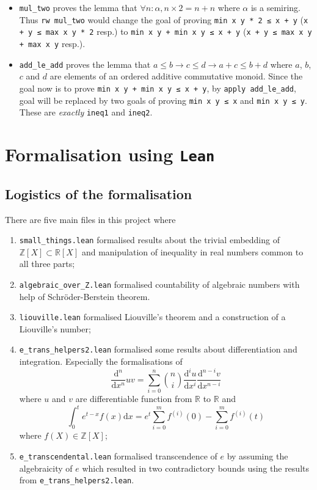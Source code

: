 \documentclass{report}
\theoremstyle{definition}
\begin{document}
\begin{itemize}
  \item {\tt \small mul\_two} proves the lemma that $\forall n:\alpha, n\times 2 = n+n$ where $\alpha$ is a semiring. Thus {\tt \small rw mul\_two} would change the goal of proving {\tt \small min x y * 2 ≤ x + y} ({\tt \small x + y ≤ max x y * 2} resp.) to {\tt \small min x y + min x y ≤ x + y} ({\tt \small x + y ≤ max x y + max x y} resp.).
  \item {\tt \small add\_le\_add} proves the lemma that $a \le b \to c \le d \to a + c \le b + d$ where $a$, $b$, $c$ and $d$ are elements of an ordered additive commutative monoid. Since the goal now is to prove {\tt \small min x y + min x y ≤ x + y}, by {\tt \small apply add\_le\_add}, goal will be replaced by two goals of proving {\tt \small min x y ≤ x} and {\tt \small min x y ≤ y}. These are {\it exactly} {\tt \small ineq1} and {\tt \small ineq2}.
\end{itemize}

\chapter{Formalisation using {\tt Lean}}\label{fmlsn}

\section*{Logistics of the formalisation}
There are five main files in this project where 
\begin{enumerate}
\item {\tt \small small\_things.lean} formalised results about the trivial embedding of $\mathbb Z[X]\subset \mathbb R[X]$ and manipulation of inequality in real numbers common to all three parts;
\item {\tt \small algebraic\_over\_Z.lean} formalised countability of algebraic numbers with help of Schröder-Berstein theorem.
\item {\tt \small liouville.lean} formalised Liouville's theorem and a construction of a Liouville's number;
\item {\tt \small e\_trans\_helpers2.lean} formalised some results about differentiation and integration. Especially the formalisations of 
$$
\frac{\mathrm d^n}{\mathrm d x^n}uv = \sum_{i=0}^n{n \choose i}\frac{\mathrm d^i u}{\mathrm d x^i}\frac{\mathrm d^{n-i} v}{\mathrm d x^{n-i}}
$$ where $u$ and $v$ are differentiable function from $\mathbb R$ to $\mathbb R$ and
$$
\int_0^t e^{t-x}f(x)\mathrm{d}x=e^t\sum_{i=0}^m f^{(i)}(0)-\sum_{i=0}^m f^{(i)}(t)
$$ where $f(X)\in\mathbb Z[X]$;
\item {\tt \small e\_transcendental.lean} formalised transcendence of $e$ by assuming the algebraicity of $e$ which resulted in two contradictory bounds using the results from {\tt \small e\_trans\_helpers2.lean}.
\end{enumerate}
\end{document}
